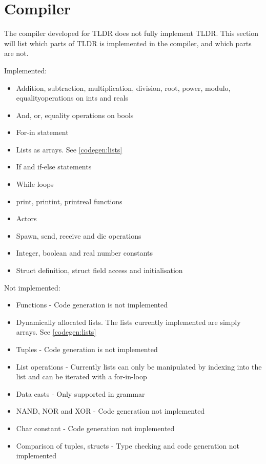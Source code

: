 \section{Compiler}

The compiler developed for TLDR does not fully implement TLDR. This section will list which parts of TLDR is implemented in the compiler, and which parts are not.


Implemented:

\begin{itemize}
\item Addition, subtraction, multiplication, division, root, power, modulo, equalityoperations on ints and reals
\item And, or, equality operations on bools
\item For-in statement
\item Lists as arrays. See \cref{codegen:lists}
\item If and if-else statements
\item While loops
\item print, printint, printreal functions
\item Actors
\item Spawn, send, receive and die operations
\item Integer, boolean and real number constants
\item Struct definition, struct field access and initialisation
\end{itemize}

Not implemented:

\begin{itemize}
\item Functions - Code generation is not implemented
\item Dynamically allocated lists. The lists currently implemented are simply arrays. See \cref{codegen:lists}
\item Tuples - Code generation is not implemented
\item List operations - Currently lists can only be manipulated by indexing into the list and can be iterated with a for-in-loop
\item Data casts - Only supported in grammar
\item NAND, NOR and XOR - Code generation not implemented
\item Char constant - Code generation not implemented
\item Comparison of tuples, structs - Type checking and code generation not implemented
\end{itemize}